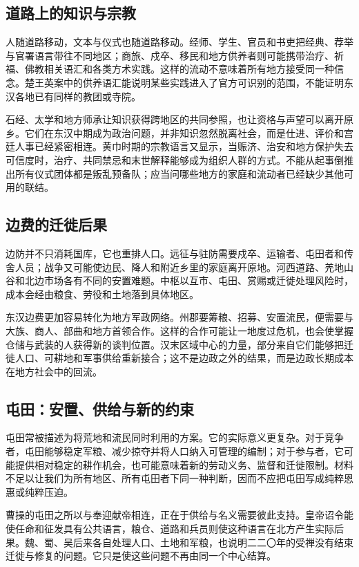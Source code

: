 \subsection{道路上的知识与宗教}

人随道路移动，文本与仪式也随道路移动。经师、学生、官员和书吏把经典、荐举与官署语言带往不同地区；商旅、戍卒、移民和地方供养者则可能携带治疗、祈福、佛教相关语汇和各类方术实践。这样的流动不意味着所有地方接受同一种信念。楚王英案中的供养语汇能说明某些实践进入了官方可识别的范围，不能证明东汉各地已有同样的教团或寺院。

石经、太学和地方师承让知识获得跨地区的共同参照，也让资格与声望可以离开原乡。它们在东汉中期成为政治问题，并非知识忽然脱离社会，而是仕进、评价和宫廷人事已经紧密相连。黄巾时期的宗教语言又显示，当赈济、治安和地方保护失去可信度时，治疗、共同禁忌和末世解释能够成为组织人群的方式。不能从起事倒推出所有仪式团体都是叛乱预备队；应当问哪些地方的家庭和流动者已经缺少其他可用的联结。

\subsection{边费的迁徙后果}

边防并不只消耗国库，它也重排人口。远征与驻防需要戍卒、运输者、屯田者和传舍人员；战争又可能使边民、降人和附近乡里的家庭离开原地。河西道路、羌地山谷和北边市场各有不同的安置难题。中枢以互市、屯田、赏赐或迁徙处理风险时，成本会经由粮食、劳役和土地落到具体地区。

东汉边费更加容易转化为地方军政网络。州郡要筹粮、招募、安置流民，便需要与大族、商人、部曲和地方首领合作。这样的合作可能让一地度过危机，也会使掌握仓储与武装的人获得新的谈判位置。汉末区域中心的力量，部分来自它们能够把迁徙人口、可耕地和军事供给重新接合；这不是边政之外的结果，而是边政长期成本在地方社会中的回流。

\subsection{屯田：安置、供给与新的约束}

屯田常被描述为将荒地和流民同时利用的方案。它的实际意义更复杂。对于竞争者，屯田能够稳定军粮、减少掠夺并将人口纳入可管理的编制；对于参与者，它可能提供相对稳定的耕作机会，也可能意味着新的劳动义务、监督和迁徙限制。材料不足以让我们为所有地区、所有屯田者下同一种判断，因而不应把屯田写成纯粹恩惠或纯粹压迫。

曹操的屯田之所以与奉迎献帝相连，正在于供给与名义需要彼此支持。皇帝诏令能使任命和征发具有公共语言，粮仓、道路和兵员则使这种语言在北方产生实际后果。魏、蜀、吴后来各自处理人口、土地和军粮，也说明二二〇年的受禅没有结束迁徙与修复的问题。它只是使这些问题不再由同一个中心结算。

